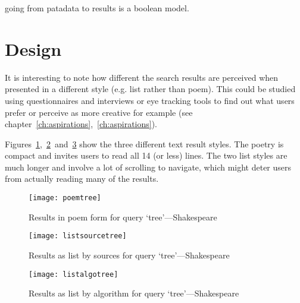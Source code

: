 going from patadata to results is a boolean model.

 







\section{Design}

It is interesting to note how different the search results are perceived when presented in a different style (e.g. list rather than poem). This could be studied using questionnaires and interviews or eye tracking tools to find out what users prefer or perceive as more creative for example (see chapter~\ref{ch:aspirations},~\ref{ch:aspirations}). 


Figures~\ref{fig:poemtree},~\ref{fig:listsourcetree}~and~\ref{fig:listalgotree} show the three different text result styles. The poetry is compact and invites users to read all \num{14} (or less) lines. The two list styles are much longer and involve a lot of scrolling to navigate, which might deter users from actually reading many of the results.

\begin{figure}[!htbp]
\centering
  \texttt{[image: poemtree]}
\caption[Results as poem]{Results in poem form for query `tree'---Shakespeare}
\label{fig:poemtree}
\end{figure}

\begin{figure}[!htbp]
\centering
  \texttt{[image: listsourcetree]}
\caption[Results as list by sources]{Results as list by sources for query `tree'---Shakespeare}
\label{fig:listsourcetree}
\end{figure}

\begin{figure}[!htbp]
\centering
  \texttt{[image: listalgotree]}
\caption[Results as list by algorithm]{Results as list by algorithm for query `tree'---Shakespeare}
\label{fig:listalgotree}
\end{figure}


